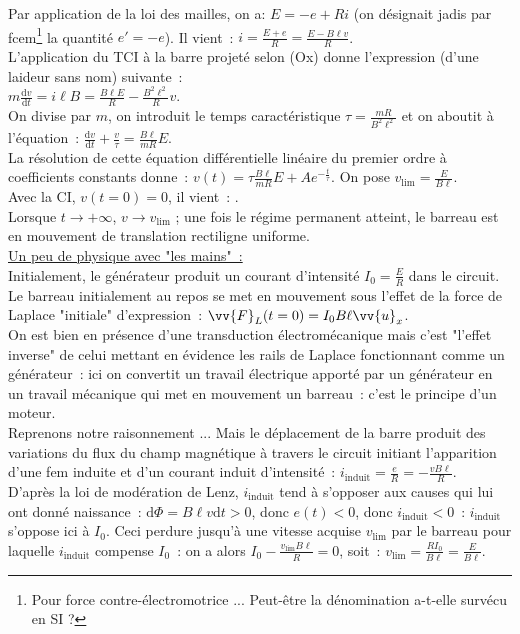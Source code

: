 \documentclass{article}
\renewcommand\overrightarrow{\vv}
\begin{document}
Par application de la loi des mailles, on a: $E = -e+Ri$ (on
désignait jadis par fcem\footnote{Pour force contre-électromotrice
... Peut-être la dénomination a-t-elle survécu en SI ?} la quantité
$e' = -e$). Il
vient : $i = \frac{E+e}{R} = \frac{E-B\ell v}{R}$. \\
L'application du TCI à la barre projeté selon (Ox) donne l'expression (d'une laideur sans nom) suivante : \\
$m\frac{\mathrm{d}v}{\mathrm{d}t} = i\ell B = \frac{B \ell E}{R} -
\frac{B^{2}\ell^{2}}{R}v$. \\
On divise par $m$, on introduit le
temps caractéristique $\tau = \frac{mR}{B^{2}\ell^{2}}$ et on
aboutit à
l'équation : $\frac{\mathrm{d}v}{\mathrm{d}t}+\frac{v}{\tau} = \frac{B\ell}{mR}E$. \\
La résolution de cette équation différentielle linéaire du premier
ordre à coefficients constants donne : $v(t) = \tau\frac{B\ell}{mR}E
+Ae^{-\frac{t}{\tau}}$. On pose $v_{\mathrm{lim}} = \frac{E}{B\ell}$. \\
Avec la CI, $v(t=0) = 0$, il vient : . \\
Lorsque $t \rightarrow +\infty$, $v \rightarrow v_{\mathrm{lim}}$ ; une fois
le régime permanent atteint, le barreau est en mouvement de
translation rectiligne uniforme. \\
\underline{Un peu de physique avec "les mains" :} \\
Initialement, le générateur produit un courant d'intensité $I_{0} =
\frac{E}{R}$ dans le circuit. Le barreau initialement au repos se
met en mouvement sous l'effet de la force de Laplace "initiale"
d'expression : $\overrightarrow{F}_{L} (t=0) =
I_{0}B \ell\overrightarrow{u}_{x}$. \\
On est bien en présence d'une transduction électromécanique mais
c'est "l'effet inverse" de celui mettant en évidence les rails de
Laplace fonctionnant comme un générateur : ici on convertit un
travail électrique apporté par un générateur en un travail mécanique
qui met en mouvement un barreau : c'est le principe d'un moteur.\\
Reprenons notre raisonnement ... Mais le déplacement de la barre
produit des variations du flux du champ magnétique à travers le
circuit initiant l'apparition d'une fem induite et d'un courant
induit d'intensité : $i_{\mathrm{in\mathrm{d}uit}} =
\frac{e}{R} = -\frac{vB\ell}{R}$. \\
D'après la loi de modération de Lenz, $i_{\mathrm{in\mathrm{d}uit}}$ tend à s'opposer
aux causes qui lui ont donné naissance : $\mathrm{d}\Phi = B\ell v \mathrm{d}t >0$,
donc $e(t) < 0$, donc $i_{\mathrm{in\mathrm{d}uit}} < 0$ : $i_{\mathrm{in\mathrm{d}uit}}$ s'oppose ici à
$I_{0}$. Ceci perdure jusqu'à une vitesse acquise $v_{\mathrm{lim}}$ par le
barreau pour laquelle $i_{\mathrm{in\mathrm{d}uit}}$ compense $I_{0}$ : on a alors
$I_{0}-\frac{v_{\mathrm{lim}}B\ell}{R}=0$, soit : $v_{\mathrm{lim}} = \frac{RI_{0}}{B
\ell} = \frac{E}{B \ell}$.\\
\end{document}
